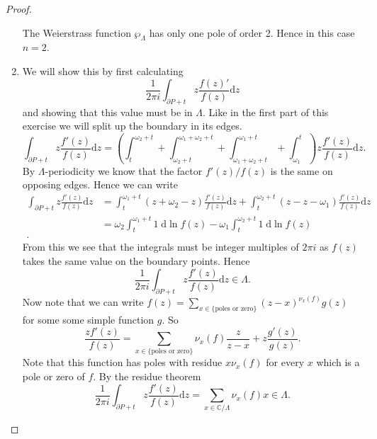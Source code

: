 \documentclass[titlepage,a4paper]{article}
\theoremstyle{theoremdd}
\theoremstyle{definitiondd}
\theoremstyle{remarkdd}
\newcommand{\C}{\mathbb{C}}
\begin{document}
\begin{proof}
\begin{enumerate}
The Weierstrass function $\wp_{\Lambda}$ has only one pole of order 2. Hence in this case  $n = 2$.
\item 
	We will show this by first calculating \[
		\frac{1}{2\pi i}\int_{\partial P + t} z \frac{f(z)'}{f(z)} \mathrm d z
	\]
	and showing that this value must be in $\Lambda$.
	Like in the first part of this exercise we will split up the boundary in its edges.
	\[	
		\int_{\partial P+ t} z \frac{f'(z)}{f(z)} \mathrm d z = \left(\int_t^{\omega_2 + t} + \int_{\omega_2+t}^{\omega_1 + \omega_2 + t} + \int_{\omega_1 + \omega_2 + t} ^{\omega_1 + t} + \int_{\omega_1}^{t}\right) z \frac{f'(z)}{f(z)} \mathrm dz
	.\]
	By $\Lambda$-periodicity we know that the factor $f'(z) / f(z)$ is the same on opposing edges. Hence we can write \begin{align*}
		\int_{\partial P + t} z \frac{f'(z)}{f(z)} \mathrm d z &= \int_t^{\omega_1 + t} (z + \omega_2 - z) \frac{f'(z)}{f(z)} \mathrm d z + \int_{t}^{\omega_2 + t} (z - z - \omega_1) \frac{f'(z)}{f(z)} \mathrm d z\\
								       &= \omega_2 \int_t^{\omega_1 + t} 1 \; \mathrm d \ln f(z) - \omega_1 \int_t^{\omega_2 +t} 1 \; \mathrm d \ln f(z) \\
	.\end{align*} 
	From this we see that the integrals must be integer multiples of  $2\pi i$ as $f(z)$ takes the same value on the boundary points. 
	Hence 
	\[
		\frac{1}{2\pi i } \int_{\partial P + t} z \frac{f'(z)}{f(z)} \mathrm d z \in \Lambda
	.\] 
	Now note that we can write $f(z) = \sum_{x \in \{\text{poles or zero}\} }(z - x)^{\nu_x(f)}g(z)$ for some some simple function $g$. 
	So \[
		\frac{zf'(z)}{f(z)} = \sum_{x \in \{\text{poles or zero}\} }\nu_x(f) \frac{z}{ z - x} + z \frac{g'(z)}{g(z)}
	.\] 
	Note that this function has poles with residue $x \nu_x(f)$ for every $x$ which is a pole or zero of  $f$. By the residue theorem  \[
		\frac{1}{2\pi i} \int_{\partial P + t} z \frac{f'(z)}{f(z)} \mathrm d z = \sum_{x \in \C / \Lambda} \nu_x(f)  x \in \Lambda 
	.\]  
\end{enumerate}
\end{proof}
\printbibliography
\end{document}

